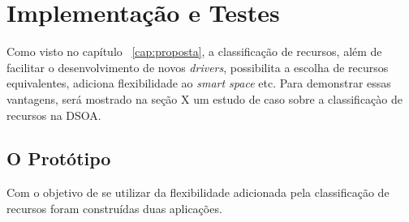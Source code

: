 \chapter{Implementação e Testes}

Como visto no capítulo ~\ref{cap:proposta}, a classificação de recursos, além de facilitar o desenvolvimento de novos \emph{drivers}, possibilita a escolha de recursos equivalentes, adiciona flexibilidade ao \emph{smart space} etc. Para demonstrar essas vantagens, será mostrado na seção X um estudo de caso sobre a classificaçào de recursos na DSOA.

\section{O Protótipo}
Com o objetivo de se utilizar da flexibilidade adicionada pela classificação de recursos foram construídas duas aplicações. 